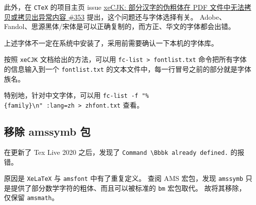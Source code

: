 \documentclass[../Main/thesis.tex]{subfiles}
\begin{document}
此外，在 \texttt{CTeX} 的项目主页 issue
\href{https://github.com/CTeX-org/ctex-kit/issues/353}{xeCJK:
部分汉字的伪粗体在 PDF 文件中无法拷贝或拷贝出异常内容 \#353}
提出，这个问题还与字体选择有关。
Adobe、Fandol、思源黑体/宋体是可以正确复制的，而方正、华文的字体都会出错。

\begin{Shaded}
\end{Shaded}

上述字体不一定在系统中安装了，采用前需要确认一下本机的字体库。

按照 \texttt{xeCJK} 文档给出的方法，可以用
\texttt{fc-list\ \textgreater{}\ fontlist.txt}
命令把所有字体的信息输入到一个 \texttt{fontlist.txt}
的文本文件中，每一行冒号之前的部分就是字体族名。

特别地，针对中文字体，可以用
\texttt{fc-list\ -f\ "\%\{family\}\textbackslash{}n"\ :lang=zh\ \textgreater{}\ zhfont.txt}
查看。

\subsection{移除 amssymb 包}

在更新了 Tex Live 2020 之后，发现了
\texttt{Command\ \textasciigrave{}\textbackslash{}Bbbk\textquotesingle{}\ already\ defined.}
的报错。

原因是 \texttt{XeLaTeX} 与 \texttt{amsfont} 中有了重复定义。 查阅 AMS
宏包，发现 \texttt{amssymb}
只是提供了部分数学字符的粗体、而且可以被标准的 \texttt{bm} 宏包取代。
故将其移除，仅保留 \texttt{amsmath}。
\end{document}
